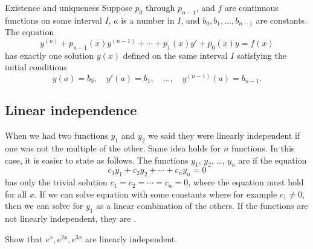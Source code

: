 \documentclass{ximera}
\begin{document}
\begin{theorem}{Existence and uniqueness}
    Suppose $p_0$ through $p_{n-1}$, and $f$ are continuous functions on some interval $I$, $a$ is a number in $I$, and $b_0, b_1, \ldots, b_{n-1}$ are constants. The equation
    \begin{equation*} %
        y^{(n)} + p_{n-1}(x)y^{(n-1)} + \cdots + p_1(x) y' + p_0(x) y = f(x) 
    \end{equation*}
    has exactly one solution $y(x)$ defined on the same interval $I$ satisfying the initial conditions
    \begin{equation*}
        y(a) = b_0, \quad y'(a) = b_1, \quad \ldots, \quad y^{(n-1)}(a) = b_{n-1} .
    \end{equation*}
\end{theorem}

\subsection{Linear independence}

When we had two functions $y_1$ and $y_2$ we said they were linearly independent if one was not the multiple of the other.  Same idea holds for $n$ functions.  In this case, it is easier to state as follows. The functions $y_1$, $y_2$, \ldots, $y_n$ are \emph{} if the equation
\begin{equation*}
    c_1 y_1 + c_2 y_2 + \cdots + c_n y_n = 0 
\end{equation*}
has only the trivial solution $c_1 = c_2 = \cdots = c_n = 0$, where the equation must hold for all $x$.  If we can solve equation with some constants where for example $c_1 \not= 0$, then we can solve for $y_1$ as a linear combination of the others.  If the functions are not linearly independent, they are \emph{}.

\begin{example}
    Show that $e^x, e^{2x}, e^{3x}$ are linearly independent.
\end{example}
\end{document}
